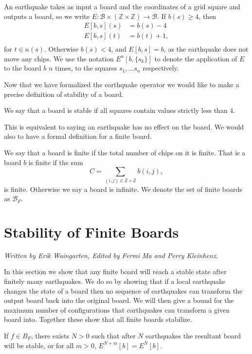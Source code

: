 \documentclass[runningheads,a4paper]{llncs}
\begin{document}
\begin{definition}
An earthquake takes as input a board and the coordinates of a grid square and outputs a board, so we write $E: \mathcal{B} \times (\mathbb{Z} \times \mathbb{Z}) \rightarrow \mathcal{B}$. If $b(s) \geq 4$, then
\begin{align*}
E[b, s](s) &= b(s)-4 \\
E[b, s](t) &= b(t)+1, \\
\end{align*}
for $ t \in n(s)$. Otherwise  $b(s) < 4$, and $E[b, s] = b$, as the earthquake does not move any chips.
We use the notation $E^n[b, \{s_k\}]$ to denote the application of $E$ to the board $b$ $n$ times, to the squares $s_1, \ldots s_{n}$ respectively. 
\end{definition}

Now that we have formalized the earthquake operator we would like to make a precise definition of stability of a board.
\begin{definition}
We say that a board is stable if all squares contain values strictly less than 4. 
\end{definition}
This is equivalent to saying an earthquake has no effect on the board. We would also to have a formal definition for a finite board. 

\begin{definition} 
We say that a board is finite if the total number of chips on it is finite. That is a board $b$ is finite if the sum
\begin{equation}
C= \sum_{(i,j) \in \mathbb{Z} \times \mathbb{Z}} b(i,j), 
\end{equation}
is finite. Otherwise we say a board is infinite. 
We denote the set of finite boards as $\mathcal{B}_F$.
\end{definition}


\section{Stability of Finite Boards}
\label{Stability of Finite Boards}
\emph{Written by Erik Waingarten, Edited by Fermi Ma and Perry Kleinhenz.}

In this section we show that any finite board will reach a stable state after finitely many earthquakes.
We do so by showing that if a local earthquake changes the state of a board then no sequence of earthquakes can transform the output board back into the original board. 
We will then give a bound for the maximum number of configurations that earthquakes can transform a given board into. 
Together these show that all finite boards stabilize. 
\begin{theorem}
\label{finitestability}
If $f \in B_F$, there exists $N> 0$ such that after $N$ earthquakes the resultant board will be stable, or for all $m > 0$, $E^{N+m}[b] = E^N[b]$.
\end{theorem}
\end{document}
